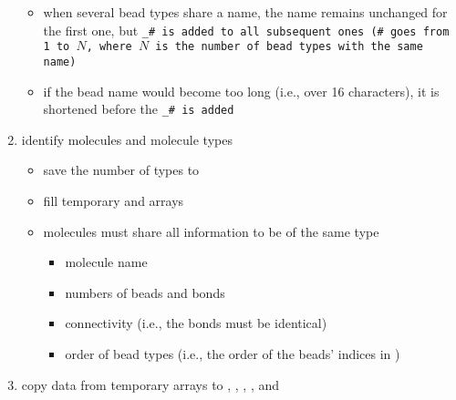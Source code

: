 \begin{enumerate}
    \begin{itemize}
      \item when several bead types share a name, the name remains unchanged for
        the first one, but \tt{_\#} is added to all subsequent ones (\tt{\#}
        goes from 1 to $N$, where $N$ is the number of bead types with the same
        name)
      \item if the bead name would become too long (i.e., over 16 characters),
        it is shortened before the \tt{_\#} is added
    \end{itemize}
  \item identify molecules and molecule types
    \begin{itemize}
      \item save the number of types to 
      \item fill temporary  and
         arrays
      \item molecules must share all information to be of the same type
        \begin{itemize}
          \item molecule name
          \item numbers of beads and bonds
          \item connectivity (i.e., the bonds must be identical)
          \item order of bead types (i.e., the order of the beads' indices in
            )
        \end{itemize}
    \end{itemize}
  \item copy data from temporary arrays to , ,
    , , and 
\end{enumerate}

